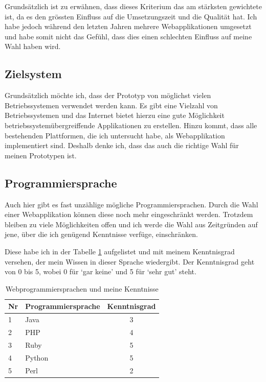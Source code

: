 Grundsätzlich ist zu erwähnen, dass dieses Kriterium das am stärksten
gewichtete ist, da es den grössten Einfluss auf die Umsetzungszeit und die
Qualität hat. Ich habe jedoch während den letzten Jahren mehrere Webapplikationen
umgesetzt und habe somit nicht das Gefühl, dass dies einen schlechten Einfluss
auf meine Wahl haben wird. 
 
\subsection{Zielsystem}
Grundsätzlich möchte ich, dass der Prototyp von möglichst vielen Betriebssystemen
verwendet werden kann. Es gibt eine Vielzahl von Betriebssystemen \cite{betriebssysteme}
und das Internet bietet hierzu eine gute Möglichkeit betriebssystemübergreiffende
Applikationen zu erstellen. Hinzu kommt, dass alle bestehenden Plattformen,
die ich untersucht habe, als Webapplikation implementiert sind. Deshalb denke ich, 
dass das auch die richtige Wahl für meinen Prototypen ist.

\subsection{Programmiersprache}
Auch hier gibt es fast unzählige mögliche Programmiersprachen. Durch die Wahl
einer Webapplikation können diese noch mehr eingeschränkt werden. Trotzdem 
bleiben zu viele Möglichkeiten offen \cite{programmiersprachen} und ich werde 
die Wahl aus Zeitgründen auf jene, über die ich genügend Kenntnisse verfüge, 
einschränken.

Diese habe ich in der Tabelle \ref{tab:programmiersprachen} aufgelistet und 
mit meinem Kenntnisgrad versehen, der mein Wissen in dieser Sprache wiedergibt.
Der Kenntnisgrad geht von 0 bis 5, wobei 0 für `gar keine' und 5 für `sehr gut'
steht.

\begin{table}[h]
\begin{center}
    \begin{tabular}{llc}
        \toprule Nr & Programmiersprache & Kenntnisgrad \\
        \midrule 1 & Java & 3 \\
        \midrule 2 & PHP & 4 \\
        \midrule 3 & Ruby & 5 \\
        \midrule 4 & Python & 5 \\
        \midrule 5 & Perl & 2 \\
        \bottomrule
    \end{tabular}
    \caption{Webprogrammiersprachen und meine Kenntnisse}
    \label{tab:programmiersprachen}
\end{center}
\end{table}

